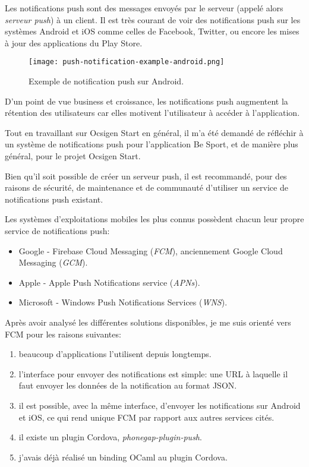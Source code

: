 Les notifications push sont des messages envoyés par le serveur (appelé alors
\emph{serveur push}) à un client.
Il est très courant de voir des notifications push sur les systèmes Android
et iOS comme celles de Facebook, Twitter, ou encore les mises à jour des
applications du Play Store.

\begin{figure}
  \centering
  \texttt{[image: push-notification-example-android.png]}
  \caption{Exemple de notification push sur Android.}
\end{figure}

D'un point de vue business et croissance, les notifications push
augmentent la rétention des utilisateurs car elles motivent l'utilisateur à
accéder à l'application.

Tout en travaillant sur Ocsigen Start en général, il m'a été demandé de
réfléchir à un système de notifications push pour l'application Be Sport, et de
manière plus général, pour le projet Ocsigen Start.

Bien qu'il soit possible de créer un serveur push,
il est recommandé, pour des raisons de sécurité, de maintenance et de communauté
d'utiliser un service de notifications push existant.

Les systèmes d'exploitations mobiles les plus connus possèdent chacun leur propre
service de notifications push:
\begin{itemize}
  \item Google - Firebase Cloud Messaging (\emph{FCM}), anciennement Google Cloud
  Messaging (\emph{GCM}).
  \item Apple - Apple Push Notifications service (\emph{APNs}).
  \item Microsoft - Windows Push Notifications Services (\emph{WNS}).
\end{itemize}

Après avoir analysé les différentes solutions disponibles, je me suis orienté
vers FCM pour les raisons suivantes:

\begin{enumerate}
  \item beaucoup d'applications l'utilisent depuis longtemps.
  \item l'interface pour envoyer des notifications est simple: une URL à
    laquelle il faut envoyer les données de la notification au format JSON.
  \item il est possible, avec la même interface, d'envoyer les notifications sur
    Android et iOS, ce qui rend unique FCM par rapport aux autres services cités.
  \item il existe un plugin Cordova, \emph{phonegap-plugin-push}.
  \item j'avais déjà réalisé un binding OCaml au plugin Cordova\cite{ocaml-cordova-plugin-push-notifications}.
\end{enumerate}

